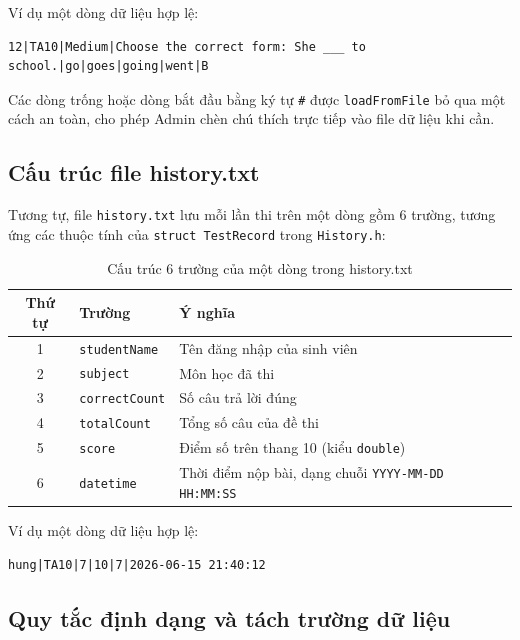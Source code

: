 \documentclass[11pt]{report}
\begin{document}
Ví dụ một dòng dữ liệu hợp lệ:
{\small
\begin{verbatim}
12|TA10|Medium|Choose the correct form: She ___ to school.|go|goes|going|went|B
\end{verbatim}
}

Các dòng trống hoặc dòng bắt đầu bằng ký tự \texttt{\#} được \texttt{loadFromFile} bỏ qua một cách an toàn, cho phép Admin chèn chú thích trực tiếp vào file dữ liệu khi cần.

\subsection{Cấu trúc file history.txt}

Tương tự, file \texttt{history.txt} lưu mỗi lần thi trên một dòng gồm 6 trường, tương ứng các thuộc tính của \texttt{struct TestRecord} trong \texttt{History.h}:

\begin{table}[H]
    \centering
    \begin{tabularx}{\textwidth}{|c|l|X|} \hline
        \textbf{Thứ tự} & \textbf{Trường} & \textbf{Ý nghĩa} \\ \hline
        1 & \texttt{studentName} & Tên đăng nhập của sinh viên \\ \hline
        2 & \texttt{subject} & Môn học đã thi \\ \hline
        3 & \texttt{correctCount} & Số câu trả lời đúng \\ \hline
        4 & \texttt{totalCount} & Tổng số câu của đề thi \\ \hline
        5 & \texttt{score} & Điểm số trên thang 10 (kiểu \texttt{double}) \\ \hline
        6 & \texttt{datetime} & Thời điểm nộp bài, dạng chuỗi \texttt{YYYY-MM-DD HH:MM:SS} \\ \hline
    \end{tabularx}
    \caption{Cấu trúc 6 trường của một dòng trong history.txt}
    \label{tab:history_format}
\end{table}

Ví dụ một dòng dữ liệu hợp lệ:
\begin{verbatim}
hung|TA10|7|10|7|2026-06-15 21:40:12
\end{verbatim}

\subsection{Quy tắc định dạng và tách trường dữ liệu}
\end{document}
